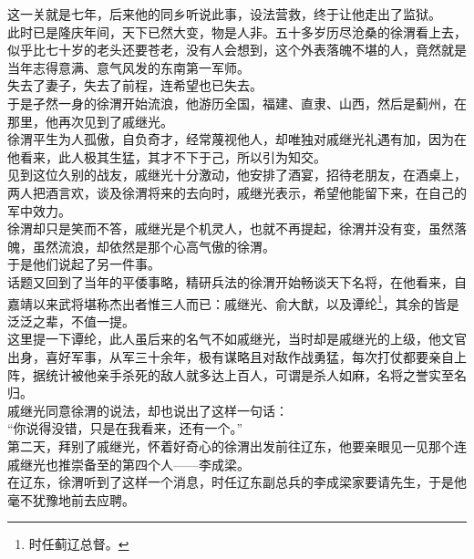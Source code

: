 \begin{multicols}{\theparacolNo}
这一关就是七年，后来他的同乡听说此事，设法营救，终于让他走出了监狱。\\

此时已是隆庆年间，天下已然大变，物是人非。五十多岁历尽沧桑的徐渭看上去，似乎比七十岁的老头还要苍老，没有人会想到，这个外表落魄不堪的人，竟然就是当年志得意满、意气风发的东南第一军师。\\

失去了妻子，失去了前程，连希望也已失去。\\

于是孑然一身的徐渭开始流浪，他游历全国，福建、直隶、山西，然后是蓟州，在那里，他再次见到了戚继光。\\

徐渭平生为人孤傲，自负奇才，经常蔑视他人，却唯独对戚继光礼遇有加，因为在他看来，此人极其生猛，其才不下于己，所以引为知交。\\

见到这位久别的战友，戚继光十分激动，他安排了酒宴，招待老朋友，在酒桌上，两人把酒言欢，谈及徐渭将来的去向时，戚继光表示，希望他能留下来，在自己的军中效力。\\

徐渭却只是笑而不答，戚继光是个机灵人，也就不再提起，徐渭并没有变，虽然落魄，虽然流浪，却依然是那个心高气傲的徐渭。\\

于是他们说起了另一件事。\\

话题又回到了当年的平倭事略，精研兵法的徐渭开始畅谈天下名将，在他看来，自嘉靖以来武将堪称杰出者惟三人而已：戚继光、俞大猷，以及谭纶\footnote{时任蓟辽总督。}，其余的皆是泛泛之辈，不值一提。\\

这里提一下谭纶，此人虽后来的名气不如戚继光，当时却是戚继光的上级，他文官出身，喜好军事，从军三十余年，极有谋略且对敌作战勇猛，每次打仗都要亲自上阵，据统计被他亲手杀死的敌人就多达上百人，可谓是杀人如麻，名将之誉实至名归。\\

戚继光同意徐渭的说法，却也说出了这样一句话：\\

“你说得没错，只是在我看来，还有一个。”\\

第二天，拜别了戚继光，怀着好奇心的徐渭出发前往辽东，他要亲眼见一见那个连戚继光也推崇备至的第四个人——李成梁。\\

在辽东，徐渭听到了这样一个消息，时任辽东副总兵的李成梁家要请先生，于是他毫不犹豫地前去应聘。\\


\end{multicols}
